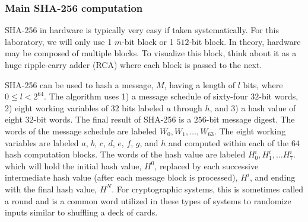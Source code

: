 \documentclass{article}
\begin{document}
\subsubsection{Main SHA-256 computation}

SHA-256 in hardware is typically very easy if taken systematically.
For this laboratory, we will only use 1 $m$-bit block or 1 $512$-bit
block.  In theory, hardware may be composed of multiple blocks.  To
visualize this block, think about it as a huge ripple-carry adder (RCA)
where each block is passed to the next.

SHA-256 can be used to hash a message, $M$, having a length of $l$
bits, where $0 \leq l < 2^{64}$. The
algorithm uses 1) a message schedule of sixty-four $32$-bit words,
2) eight working variables of $32$
bits labeled $a$ through $h$, and 3) a hash value of eight $32$-bit words.
The final result of SHA-256 is a $256$-bit
message digest.
The words of the message schedule are labeled
$W_0, W_1, \ldots, W_{63}$. The
eight working variables are labeled $a$, $b$, $c$, $d$, $e$, $f$, $g$,
and $h$ and computed within each of the $64$ hash computation blocks.
The words of the hash value are labeled $H_0^i, H_1^i, \ldots H_7^i$.
which will hold the initial hash value, $H^0$, replaced by each
successive intermediate hash value
(after each message block is processed), $H^i$, and ending with the
final hash value, $H^N$.  For cryptographic systems, this is sometimes
called a round and is a common word utilized in these types of systems
to randomize inputs similar to shuffling a deck of cards.
\end{document}
